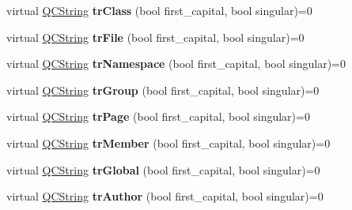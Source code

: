 \begin{DoxyCompactItemize}
\item 
\hypertarget{class_translator_a8a3f3c2fdd8238c2cfdefcc60f0519fd}{virtual \hyperlink{class_q_c_string}{Q\-C\-String} {\bfseries tr\-Class} (bool first\-\_\-capital, bool singular)=0}\label{class_translator_a8a3f3c2fdd8238c2cfdefcc60f0519fd}

\item 
\hypertarget{class_translator_a4b2faea77f064bf7ef788024dd442949}{virtual \hyperlink{class_q_c_string}{Q\-C\-String} {\bfseries tr\-File} (bool first\-\_\-capital, bool singular)=0}\label{class_translator_a4b2faea77f064bf7ef788024dd442949}

\item 
\hypertarget{class_translator_ad16aa0de8192fbd01e6be2fd847fb922}{virtual \hyperlink{class_q_c_string}{Q\-C\-String} {\bfseries tr\-Namespace} (bool first\-\_\-capital, bool singular)=0}\label{class_translator_ad16aa0de8192fbd01e6be2fd847fb922}

\item 
\hypertarget{class_translator_a5a53f5fda06c04d097ec91d5ea822aaf}{virtual \hyperlink{class_q_c_string}{Q\-C\-String} {\bfseries tr\-Group} (bool first\-\_\-capital, bool singular)=0}\label{class_translator_a5a53f5fda06c04d097ec91d5ea822aaf}

\item 
\hypertarget{class_translator_ac79ca8ac33bff8ee999fc7bc3ce2eaa0}{virtual \hyperlink{class_q_c_string}{Q\-C\-String} {\bfseries tr\-Page} (bool first\-\_\-capital, bool singular)=0}\label{class_translator_ac79ca8ac33bff8ee999fc7bc3ce2eaa0}

\item 
\hypertarget{class_translator_a2a6070ae3180ebd724f97c236063bc86}{virtual \hyperlink{class_q_c_string}{Q\-C\-String} {\bfseries tr\-Member} (bool first\-\_\-capital, bool singular)=0}\label{class_translator_a2a6070ae3180ebd724f97c236063bc86}

\item 
\hypertarget{class_translator_a8ccde2cdccee74c8427b8d3105da805b}{virtual \hyperlink{class_q_c_string}{Q\-C\-String} {\bfseries tr\-Global} (bool first\-\_\-capital, bool singular)=0}\label{class_translator_a8ccde2cdccee74c8427b8d3105da805b}

\item 
\hypertarget{class_translator_aff05144018c518190b75eb3b65050086}{virtual \hyperlink{class_q_c_string}{Q\-C\-String} {\bfseries tr\-Author} (bool first\-\_\-capital, bool singular)=0}\label{class_translator_aff05144018c518190b75eb3b65050086}


\end{DoxyCompactItemize}
